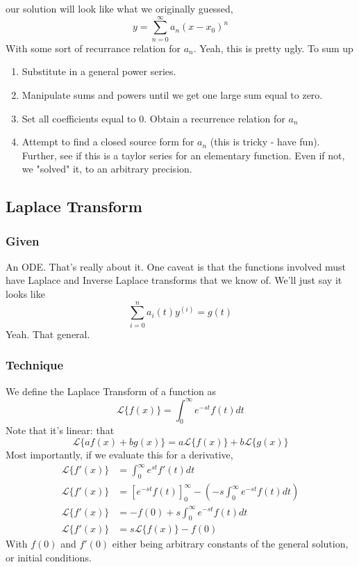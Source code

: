 \documentclass[11pt]{article}
\begin{document}
our solution will look like what we originally guessed,
    \[ y = \sum_{n=0}^{\infty}a_n(x - x_0)^n \]
With some sort of recurrance relation for $a_n$. Yeah, this is pretty ugly. To sum up
\begin{enumerate}
    \item Substitute in a general power series.
    \item Manipulate sums and powers until we get one large sum equal to zero.
    \item Set all coefficients equal to 0. Obtain a recurrence relation for $a_n$
    \item Attempt to find a closed source form for $a_n$ (this is tricky - have fun). Further, see 
          if this is a taylor series for an elementary function. Even if not, we "solved" it, to
          an arbitrary precision.
\end{enumerate}
\subsection{Laplace Transform}
\subsubsection{Given}
An ODE. That's really about it. One caveat is that the functions involved must have Laplace and 
Inverse Laplace transforms that we know of. We'll just say it looks like
    \[ \sum_{i=0}^n a_i(t)y^{(i)}= g(t) \]
Yeah. That general.
\subsubsection{Technique}
We define the Laplace Transform of a function as
\[ \mathscr{L}\{f(x)\} = \int_{0}^{\infty} e^{-st}f(t)dt \]
Note that it's linear: that
\[ \mathscr{L}\{af(x) + bg(x)\} = a\mathscr{L}\{f(x)\} + b\mathscr{L}\{g(x)\} \]
Most importantly, if we evaluate this for a derivative,
\begin{align*}
    \mathscr{L}\{f'(x)\} &= \int_{0}^{\infty} e^{st}f'(t)dt  \\
    \mathscr{L}\{f'(x)\} &=  \left[ e^{-st}f(t)\right]_0^{\infty} -\left(- s\int_0^{\infty} e^{-st}f(t)dt \right)  \\
    \mathscr{L}\{f'(x)\} &=   -f(0) + s\int_0^{\infty} e^{-st}f(t)dt  \\
    \mathscr{L}\{f'(x)\} &=   s\mathscr{L}\{f(x)\} - f(0)
\end{align*}
With $f(0)$ and $f'(0)$ either being arbitrary constants of the general solution, or initial conditions.
\end{document}

